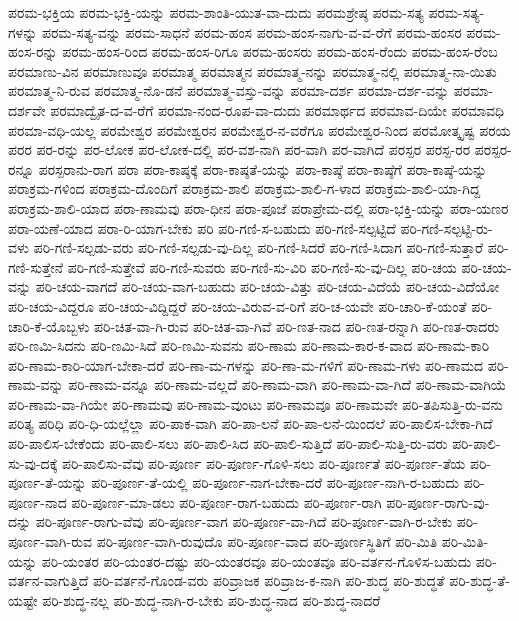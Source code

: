 {ಪರಮ-ಭಕ್ತಿಯ
ಪರಮ-ಭಕ್ತಿ-ಯನ್ನು
ಪರಮ-ಶಾಂತಿ-ಯುತ-ವಾ-ದುದು
ಪರಮಶ್ರೇಷ್ಠ
ಪರಮ-ಸತ್ಯ
ಪರಮ-ಸತ್ಯ-ಗಳನ್ನು
ಪರಮ-ಸತ್ಯ-ವನ್ನು
ಪರಮ-ಸಾಧನೆ
ಪರಮ-ಹಂಸ
ಪರಮ-ಹಂಸ-ನಾಗು-ವ-ವ-ರೆಗೆ
ಪರಮ-ಹಂಸರ
ಪರಮ-ಹಂಸ-ರನ್ನು
ಪರಮ-ಹಂಸ-ರಿಂದ
ಪರಮ-ಹಂಸ-ರಿಗೂ
ಪರಮ-ಹಂಸರು
ಪರಮ-ಹಂಸ-ರೆಂದು
ಪರಮ-ಹಂಸ-ರೆಂಬ
ಪರಮಾಣು-ವಿನ
ಪರಮಾಣುವೂ
ಪರಮಾತ್ಮ
ಪರಮಾತ್ಮನ
ಪರಮಾತ್ಮ-ನನ್ನು
ಪರಮಾತ್ಮ-ನಲ್ಲಿ
ಪರಮಾತ್ಮ-ನಾ-ಯಿತು
ಪರಮಾತ್ಮ-ನಿ-ರುವ
ಪರಮಾತ್ಮ-ನೊ-ಡನೆ
ಪರಮಾತ್ಮ-ವಸ್ತು-ವನ್ನು
ಪರಮಾ-ದರ್ಶ
ಪರಮಾ-ದರ್ಶ-ವನ್ನು
ಪರಮಾ-ದರ್ಶವೇ
ಪರಮಾದ್ವೈತ-ದ-ವ-ರೆಗೆ
ಪರಮಾ-ನಂದ-ರೂಪ-ವಾ-ದುದು
ಪರಮಾರ್ಥದ
ಪರಮಾವ-ದಿಯೇ
ಪರಮಾವಧಿ
ಪರಮಾ-ವಧಿ-ಯಲ್ಲ
ಪರಮೇಶ್ವರ
ಪರಮೇಶ್ವರನ
ಪರಮೇಶ್ವರ-ನ-ವರೆಗೂ
ಪರಮೇಶ್ವರ-ನಿಂದ
ಪರಮೋತ್ಕೃಷ್ಟ
ಪರಯ
ಪರರ
ಪರ-ರನ್ನು
ಪರ-ಲೋಕ
ಪರ-ಲೋಕ-ದಲ್ಲಿ
ಪರ-ವಶ-ನಾಗಿ
ಪರ-ವಾಗಿ
ಪರ-ವಾಗಿದೆ
ಪರಸ್ಪರ
ಪರಸ್ಪ-ರರ
ಪರಸ್ಪರ-ರನ್ನೂ
ಪರಸ್ಪರಾನು-ರಾಗ
ಪರಾ
ಪರಾ-ಕಾಷ್ಠಕ್ಕೆ
ಪರಾ-ಕಾಷ್ಠತೆ-ಯನ್ನು
ಪರಾ-ಕಾಷ್ಠೆ
ಪರಾ-ಕಾಷ್ಠೆಗೆ
ಪರಾ-ಕಾಷ್ಠೆ-ಯನ್ನು
ಪರಾಕ್ರಮ-ಗಳಿಂದ
ಪರಾಕ್ರಮ-ದೊಂದಿಗೆ
ಪರಾಕ್ರಮ-ಶಾಲಿ
ಪರಾಕ್ರಮ-ಶಾಲಿ-ಗ-ಳಾದ
ಪರಾಕ್ರಮ-ಶಾಲಿ-ಯಾ-ಗಿದ್ದ
ಪರಾಕ್ರಮ-ಶಾಲಿ-ಯಾದ
ಪರಾ-ಣಾಮವು
ಪರಾ-ಧೀನ
ಪರಾ-ಪೂಜೆ
ಪರಾಪ್ರೇಮ-ದಲ್ಲಿ
ಪರಾ-ಭಕ್ತಿ-ಯನ್ನು
ಪರಾ-ಯಣರ
ಪರಾ-ಯಣೆ-ಯಾದ
ಪರಾ-ರಿ-ಯಾಗ-ಬೇಕು
ಪರಿ
ಪರಿ-ಗಣಿ-ಸ-ಬಹುದು
ಪರಿ-ಗಣಿ-ಸಲ್ಪಟ್ಟಿದೆ
ಪರಿ-ಗಣಿ-ಸಲ್ಪಟ್ಟಿ-ರು-ವಳು
ಪರಿ-ಗಣಿ-ಸಲ್ಪಡು-ವರು
ಪರಿ-ಗಣಿ-ಸಲ್ಪಡು-ವು-ದಿಲ್ಲ
ಪರಿ-ಗಣಿ-ಸಿದರೆ
ಪರಿ-ಗಣಿ-ಸಿದಾಗ
ಪರಿ-ಗಣಿ-ಸುತ್ತಾರೆ
ಪರಿ-ಗಣಿ-ಸುತ್ತೇನೆ
ಪರಿ-ಗಣಿ-ಸುತ್ತೇವೆ
ಪರಿ-ಗಣಿ-ಸುವರು
ಪರಿ-ಗಣಿ-ಸು-ವಿರಿ
ಪರಿ-ಗಣಿ-ಸು-ವು-ದಿಲ್ಲ
ಪರಿ-ಚಯ
ಪರಿ-ಚಯ-ವನ್ನು
ಪರಿ-ಚಯ-ವಾಗದೆ
ಪರಿ-ಚಯ-ವಾಗ-ಬಹುದು
ಪರಿ-ಚಯ-ವಿತ್ತು
ಪರಿ-ಚಯ-ವಿದೆಯೆ
ಪರಿ-ಚಯ-ವಿದೆಯೋ
ಪರಿ-ಚಯ-ವಿದ್ದರೂ
ಪರಿ-ಚಯ-ವಿದ್ದಿದ್ದರೆ
ಪರಿ-ಚಯ-ವಿರುವ-ವ-ರಿಗೆ
ಪರಿ-ಚ-ಯವೇ
ಪರಿ-ಚಾರಿ-ಕೆ-ಯಂತೆ
ಪರಿ-ಚಾರಿ-ಕೆ-ಯೊಬ್ಬಳು
ಪರಿ-ಚಿತ-ವಾ-ಗಿ-ರುವ
ಪರಿ-ಚಿತ-ವಾ-ಗಿವೆ
ಪರಿ-ಣತ-ನಾದ
ಪರಿ-ಣತ-ರನ್ನಾಗಿ
ಪರಿ-ಣತ-ರಾದರು
ಪರಿ-ಣಮಿ-ಸಿದನು
ಪರಿ-ಣಮಿ-ಸಿದೆ
ಪರಿ-ಣಮಿ-ಸುವನು
ಪರಿ-ಣಾಮ
ಪರಿ-ಣಾಮ-ಕಾರ-ಕ-ವಾದ
ಪರಿ-ಣಾಮ-ಕಾರಿ
ಪರಿ-ಣಾಮ-ಕಾರಿ-ಯಾಗ-ಬೇಕಾ-ದರೆ
ಪರಿ-ಣಾ-ಮ-ಗಳನ್ನು
ಪರಿ-ಣಾ-ಮ-ಗಳಿಗೆ
ಪರಿ-ಣಾಮ-ಗಳು
ಪರಿ-ಣಾಮದ
ಪರಿ-ಣಾಮ-ವನ್ನು
ಪರಿ-ಣಾಮ-ವನ್ನೂ
ಪರಿ-ಣಾಮ-ವಲ್ಲದೆ
ಪರಿ-ಣಾಮ-ವಾಗಿ
ಪರಿ-ಣಾಮ-ವಾ-ಗಿದೆ
ಪರಿ-ಣಾಮ-ವಾಗಿಯೆ
ಪರಿ-ಣಾಮ-ವಾ-ಗಿಯೇ
ಪರಿ-ಣಾಮವು
ಪರಿ-ಣಾಮ-ವುಂಟು
ಪರಿ-ಣಾಮವೂ
ಪರಿ-ಣಾಮವೇ
ಪರಿ-ತಪಿಸುತ್ತಿ-ರು-ವನು
ಪರಿತ್ಯ
ಪರಿಧಿ
ಪರಿ-ಧಿ-ಯಲ್ಲೆಲ್ಲಾ
ಪರಿ-ಪಾಕ-ವಾಗಿ
ಪರಿ-ಪಾ-ಲನೆ
ಪರಿ-ಪಾ-ಲನೆ-ಯಿಂದಲೆ
ಪರಿ-ಪಾಲಿಸ-ಬೇಕಾ-ಗಿದೆ
ಪರಿ-ಪಾಲಿಸ-ಬೇಕೆಂದು
ಪರಿ-ಪಾಲಿ-ಸಲು
ಪರಿ-ಪಾಲಿ-ಸಿದ
ಪರಿ-ಪಾಲಿ-ಸುತ್ತಿದೆ
ಪರಿ-ಪಾಲಿ-ಸುತ್ತಿ-ರು-ವರು
ಪರಿ-ಪಾಲಿ-ಸು-ವು-ದಕ್ಕೆ
ಪರಿ-ಪಾಲಿಸು-ವೆವು
ಪರಿ-ಪೂರ್ಣ
ಪರಿ-ಪೂರ್ಣ-ಗೊಳಿ-ಸಲು
ಪರಿ-ಪೂರ್ಣತೆ
ಪರಿ-ಪೂರ್ಣ-ತೆಯ
ಪರಿ-ಪೂರ್ಣ-ತೆ-ಯನ್ನು
ಪರಿ-ಪೂರ್ಣ-ತೆ-ಯಲ್ಲಿ
ಪರಿ-ಪೂರ್ಣ-ನಾಗ-ಬೇಕಾ-ದರೆ
ಪರಿ-ಪೂರ್ಣ-ನಾಗಿ-ರ-ಬಹುದು
ಪರಿ-ಪೂರ್ಣ-ನಾದ
ಪರಿ-ಪೂರ್ಣ-ಮಾ-ಡಲು
ಪರಿ-ಪೂರ್ಣ-ರಾಗ-ಬಹುದು
ಪರಿ-ಪೂರ್ಣ-ರಾಗಿ
ಪರಿ-ಪೂರ್ಣ-ರಾಗು-ವು-ದನ್ನು
ಪರಿ-ಪೂರ್ಣ-ರಾಗು-ವೆವು
ಪರಿ-ಪೂರ್ಣ-ವಾಗ
ಪರಿ-ಪೂರ್ಣ-ವಾ-ಗಿದೆ
ಪರಿ-ಪೂರ್ಣ-ವಾಗಿ-ರ-ಬೇಕು
ಪರಿ-ಪೂರ್ಣ-ವಾಗಿ-ರುವ
ಪರಿ-ಪೂರ್ಣ-ವಾಗಿ-ರುವುದೊ
ಪರಿ-ಪೂರ್ಣ-ವಾದ
ಪರಿ-ಪೂರ್ಣಸ್ಥಿತಿಗೆ
ಪರಿ-ಮಿತಿ
ಪರಿ-ಮಿತಿ-ಯನ್ನು
ಪರಿ-ಯಂತರ
ಪರಿ-ಯಂತರ-ದಷ್ಟು
ಪರಿ-ಯಂತರವೂ
ಪರಿ-ಯಂತವೂ
ಪರಿ-ವರ್ತನ-ಗೊಳಿಸ-ಬಹುದು
ಪರಿ-ವರ್ತನ-ವಾಗುತ್ತಿದೆ
ಪರಿ-ವರ್ತನೆ-ಗೊಂಡ-ವರು
ಪರಿವ್ರಾಜಕ
ಪರಿವ್ರಾಜ-ಕ-ನಾಗಿ
ಪರಿ-ಶುದ್ಧ
ಪರಿ-ಶುದ್ಧತೆ
ಪರಿ-ಶುದ್ಧ-ತೆ-ಯಷ್ಟೇ
ಪರಿ-ಶುದ್ಧ-ನಲ್ಲ
ಪರಿ-ಶುದ್ಧ-ನಾಗಿ-ರ-ಬೇಕು
ಪರಿ-ಶುದ್ಧ-ನಾದ
ಪರಿ-ಶುದ್ಧ-ನಾದರೆ
}
